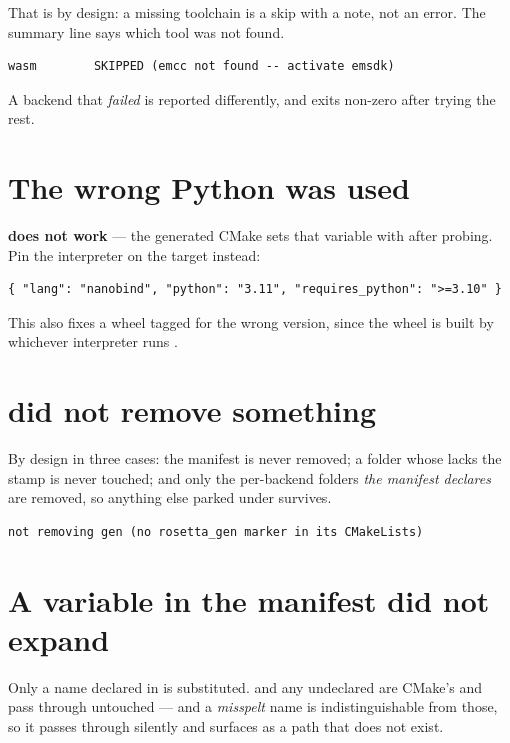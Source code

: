 That is by design: a missing toolchain is a skip with a note, not an error.
The summary line says which tool was not found.

\begin{lstlisting}[style=plain]
   wasm        SKIPPED (emcc not found -- activate emsdk)
\end{lstlisting}

A backend that \emph{failed} is reported differently, and  exits
non-zero after trying the rest.

\section{The wrong Python was used}

 \textbf{does not work} --- the
generated CMake sets that variable with  after
probing. Pin the interpreter on the target instead:

\begin{lstlisting}[style=json]
{ "lang": "nanobind", "python": "3.11", "requires_python": ">=3.10" }
\end{lstlisting}

This also fixes a wheel tagged for the wrong version, since the wheel is built
by whichever interpreter runs .

\section{ did not remove something}

By design in three cases: the manifest is never removed; a folder whose
 lacks the  stamp is never
touched; and only the per-backend folders \emph{the manifest declares} are
removed, so anything else parked under  survives.

\begin{lstlisting}[style=plain]
not removing gen (no rosetta_gen marker in its CMakeLists)
\end{lstlisting}

\section{A variable in the manifest did not expand}

Only a name declared in  is substituted. 
and any undeclared \code{\$\{\ldots\}} are CMake's and pass through untouched
--- and a \emph{misspelt} name is indistinguishable from those, so it passes
through silently and surfaces as a path that does not exist.


